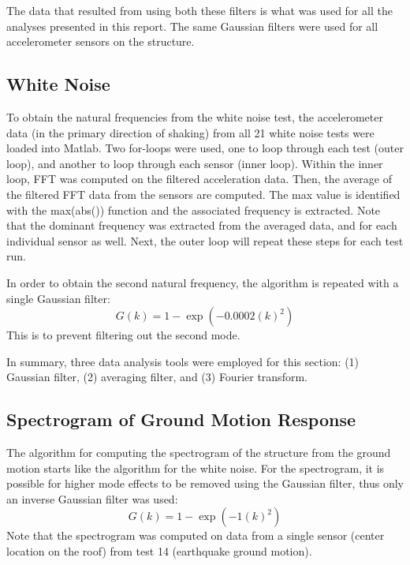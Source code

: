 \documentclass{article}
\begin{document}
The data that resulted from using both these filters is what was used for all the analyses presented in this report. The same Gaussian filters were used for all accelerometer sensors on the structure. 

\subsection{White Noise} \label{Alg:WhiteNoise}

To obtain the natural frequencies from the white noise test, the accelerometer data (in the primary direction of shaking) from all 21 white noise tests were loaded into Matlab. Two for-loops were used, one to loop through each test (outer loop), and another to loop through each sensor (inner loop). Within the inner loop, FFT was computed on the filtered acceleration data. Then, the average of the filtered FFT data from the sensors are computed. The max value is identified with the max(abs()) function and the associated frequency is extracted. Note that the dominant frequency was extracted from the averaged data, and for each individual sensor as well. Next, the outer loop will repeat these steps for each test run. 

\medskip
In order to obtain the second natural frequency, the algorithm is repeated with a single Gaussian filter:
    \begin{equation}
        G(k) = 1- \exp{(-0.0002(k)^2)}
    \end{equation}
This is to prevent filtering out the second mode.

In summary, three data analysis tools were employed for this section: (1) Gaussian filter, (2) averaging filter, and (3) Fourier transform.

\subsection{Spectrogram of Ground Motion Response}

The algorithm for computing the spectrogram of the structure from the ground motion starts like the algorithm for the white noise. For the spectrogram, it is possible for higher mode effects to be removed using the Gaussian filter, thus only an inverse Gaussian filter was used:
    \begin{equation}
        G(k) = 1- \exp{(-1(k)^2)}
    \end{equation}
Note that the spectrogram was computed on data from a single sensor (center location on the roof) from test 14 (earthquake ground motion).
\end{document}
